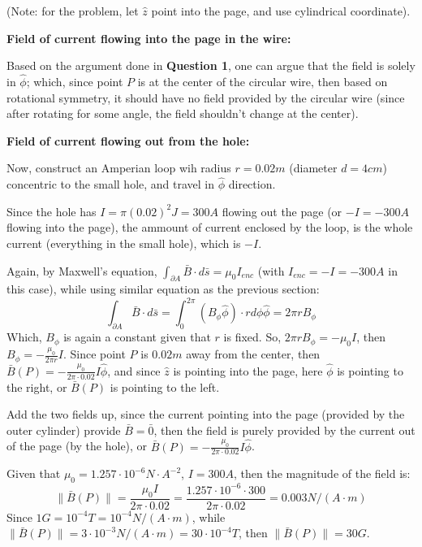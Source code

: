 \documentclass{article}
\begin{document}
(Note: for the problem, let $\hat{z}$ point into the page, and use cylindrical coordinate).

\hfill

\textbf{Field of current flowing into the page in the wire:}

Based on the argument done in \textbf{Question 1}, one can argue that the field is solely in $\hat{\phi}$; which, since point $P$ is at the center
of the circular wire, then based on rotational symmetry, it should have no field provided by the circular wire (since after rotating for some angle,
the field shouldn't change at the center).

\hfill

\textbf{Field of current flowing out from the hole:}

Now, construct an Amperian loop wih radius $r= 0.02 m$ (diameter $d= 4 cm$) concentric to the small hole, and travel in $\hat{\phi}$ direction.

Since the hole has $I=\pi(0.02)^2J=300A$ flowing out the page (or $-I=-300A$ flowing into the page), the ammount of current enclosed by the loop,
is the whole current (everything in the small hole), which is $-I$.

Again, by Maxwell's equation, $\int_{\partial A}\bar{B}\cdot d\bar{s}=\mu_0 I_{enc}$ (with $I_{enc}=-I=-300A$ in this case), while using similar equation as the previous section:
$$\int_{\partial A}\bar{B}\cdot d\bar{s}=\int_{0}^{2\pi}(B_\phi\hat{\phi})\cdot rd\phi \hat{\phi} = 2\pi r B_\phi$$
Which, $B_\phi$ is again a constant given that $r$ is fixed. So, $2\pi rB_\phi = -\mu_0I$, then $B_\phi = -\frac{\mu_0}{2\pi r}I$.
Since point $P$ is $0.02m$ away from the center, then $\bar{B}(P)=-\frac{\mu_0}{2\pi \cdot 0.02}I\hat{\phi}$, and since $\hat{z}$ is pointing into the page,
here $\hat{\phi}$ is pointing to the right, or $\bar{B}(P)$ is pointing to the left.

\hfill

Add the two fields up, since the current pointing into the page (provided by the outer cylinder) provide $\bar{B}=\bar{0}$, then the field is purely provided by the current out of the page (by the hole), or $\bar{B}(P)=-\frac{\mu_0}{2\pi \cdot 0.02}I\hat{\phi}$.

Given that $\mu_0=1.257\cdot 10^{-6}N\cdot A^{-2}$, $I=300A$, then the magnitude of the field is:
$$\|\bar{B}(P)\|=\frac{\mu_0I}{2\pi\cdot 0.02} = \frac{1.257\cdot 10^{-6}\cdot 300}{2\pi \cdot 0.02} = 0.003 N/(A\cdot m)$$
Since $1G = 10^{-4}T = 10^{-4}N/(A\cdot m)$, while $\|\bar{B}(P)\| = 3\cdot 10^{-3} N/(A\cdot m)=30 \cdot 10^{-4}T$,
then $\|\bar{B}(P)\| = 30G$.
\end{document}
